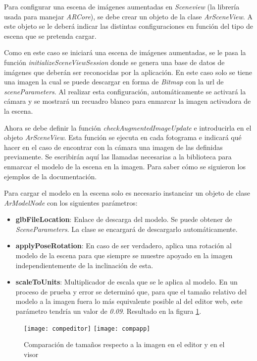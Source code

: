 Para configurar una escena de imágenes aumentadas en \textit{Sceneview} (la librería usada para manejar \textit{ARCore}), se debe crear un objeto de la clase \textit{ArSceneView}. A este objeto se le deberá indicar las distintas configuraciones en función del tipo de escena que se pretenda cargar.

Como en este caso se iniciará una escena de imágenes aumentadas, se le pasa la función \textit{initializeSceneViewSession} donde se genera una base de datos de imágenes que deberán ser reconocidas por la aplicación. En este caso solo se tiene una imagen la cual se puede descargar en forma de \textit{Bitmap} con la url de \textit{sceneParameters}. Al realizar esta configuración, automáticamente se activará la cámara y se mostrará un recuadro blanco para enmarcar la imagen activadora de la escena.

Ahora se debe definir la función \textit{checkAugmentedImageUpdate} e introducirla en el objeto \textit{ArSceneView}. Esta función se ejecuta en cada fotograma e indicará qué hacer en el caso de encontrar con la cámara una imagen de las definidas previamente. Se escribirán aquí las llamadas necesarias a la biblioteca para enmarcar el modelo de la escena en la imagen. Para saber cómo se siguieron los ejemplos de la documentación.

Para cargar el modelo en la escena solo es necesario instanciar un objeto de clase \textit{ArModelNode} con los siguientes parámetros:

\begin{itemize}
    \item \textbf{glbFileLocation}: Enlace de descarga del modelo. Se puede obtener de \textit{SceneParameters}. La clase se encargará de descargarlo automáticamente.
    \item \textbf{applyPoseRotation}: En caso de ser verdadero, aplica una rotación al modelo de la escena para que siempre se muestre apoyado en la imagen independientemente de la inclinación de esta.
    \item \textbf{scaleToUnits}: Multiplicador de escala que se le aplica al modelo. En un proceso de prueba y error se determinó que, para que el tamaño relativo del modelo a la imagen fuera lo más equivalente posible al del editor web, este parámetro tendría un valor de \textit{0.09}. Resultado en la figura \ref{fig:compeditor}.
\end{itemize}

\begin{figure}[h]
    \centering
    \texttt{[image: compeditor]}
    \texttt{[image: compapp]}
    \caption[Comparación de tamaños de modelo en editor y visor]{Comparación de tamaños respecto a la imagen en el editor y en el visor}
    \label{fig:compeditor}
\end{figure}

